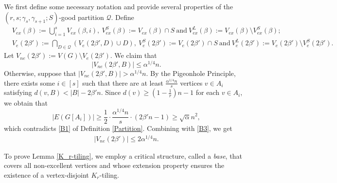 \documentclass[11pt, a4paper]{article}
\theoremstyle{definition}
\newcommand{\<}{\subseteq}
\begin{document}
We first define some necessary notation and provide several properties of the $(r,s;\gamma_s,\gamma_{s+1}; S)$-good partition $\mathcal{Q}$. Define 
\begin{align*}
    &V_{ex}(\beta):=\bigcup_{i=1}^{s}V_{ex}(\beta,i),\ V_{ex}^S(\beta):=V_{ex}(\beta)\cap S\ \text{and}\ V_{ex}^L(\beta):=V_{ex}(\beta)\setminus V_{ex}^S(\beta);\\
    &V_e{(2\beta')}:=\bigcap_{D\in \mathcal{Q}} (V_e(2\beta',D)\cup D),\ V_e^S{(2\beta')}:=V_e{(2\beta')}\cap S\ \text{and}\ V_e^L{(2\beta')}:=V_e{(2\beta')}\setminus V_e^S{(2\beta')}.
\end{align*}
Let $V_{ne}(2\beta'):=V(G)\setminus V_e(2\beta')$.  
We claim that 
$$
|V_{ne}(2\beta',B)|\le \alpha^{1/4} n.
$$
Otherwise, suppose that $|V_{ne}(2\beta',B)|> \alpha^{1/4} n$. By the Pigeonhole Principle, there exists some $i\in [s]$ such that there are at least $\frac{\alpha^{1/4} n}{s}$ vertices $v\in A_i$ satisfying $d(v,B)<|B|-2\beta' n$. Since $d(v)\ge (1-\frac{1}{r})n-1$ for each $v\in A_i$, we obtain that 
$$|E(G[A_i])|\geq \frac{1}{2}\cdot\frac{\alpha^{1/4} n}{s} \cdot (2\beta'n-1)\ge \sqrt{\alpha}n^2,$$ 
which contradicts \ref{B1} of Definition \ref{Partition}. Combining with \ref{B3}, we get
\begin{align}\label{size-of-ne}
    |V_{ne}(2\beta')|\leq 2\alpha^{1/4}n.
\end{align}





To prove Lemma \ref{K_r-tiling}, we employ a critical structure, called a \textit{base}, that covers all non-excellent vertices and whose extension property ensures the existence of a vertex-disjoint $K_r$-tiling.%

\end{document}
